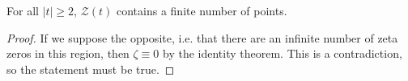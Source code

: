 \begin{theorem}[ZeroWindowFinite]
\label{ZeroWindowFinite}
\leanok
For all $|t|\geq 2$, $\mathcal{Z}(t)$ contains a finite number of points.
\end{theorem}
\begin{proof}
\leanok
If we suppose the opposite, i.e. that there are an infinite number of zeta zeros in this region,
    then $\zeta\equiv 0$ by the identity theorem. This is a contradiction, so the statement must be
    true.
\end{proof}
